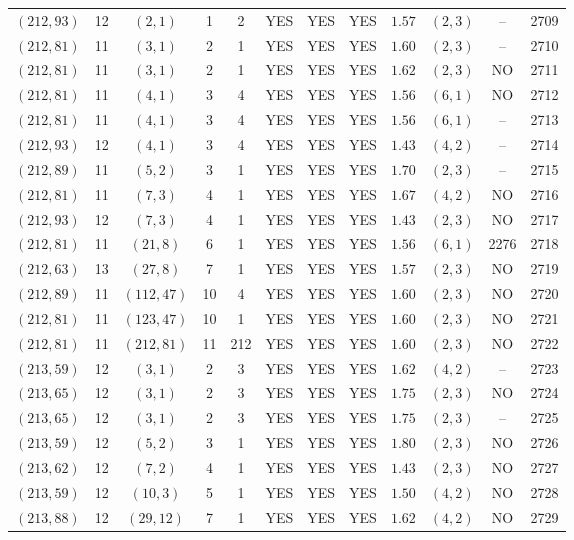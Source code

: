 \begin{longtable}{|c|c|c|c|c|c|c|c|c|c|c|c|}
$(212,93)$ & 12 & $(2,1)$ & 1 & 2 & YES & YES & YES & $1.57$ & $(2,3)$ & -- & 2709\\
$(212,81)$ & 11 & $(3,1)$ & 2 & 1 & YES & YES & YES & $1.60$ & $(2,3)$ & -- & 2710\\
$(212,81)$ & 11 & $(3,1)$ & 2 & 1 & YES & YES & YES & $1.62$ & $(2,3)$ & NO & 2711\\
$(212,81)$ & 11 & $(4,1)$ & 3 & 4 & YES & YES & YES & $1.56$ & $(6,1)$ & NO & 2712\\
$(212,81)$ & 11 & $(4,1)$ & 3 & 4 & YES & YES & YES & $1.56$ & $(6,1)$ & -- & 2713\\
$(212,93)$ & 12 & $(4,1)$ & 3 & 4 & YES & YES & YES & $1.43$ & $(4,2)$ & -- & 2714\\
$(212,89)$ & 11 & $(5,2)$ & 3 & 1 & YES & YES & YES & $1.70$ & $(2,3)$ & -- & 2715\\
$(212,81)$ & 11 & $(7,3)$ & 4 & 1 & YES & YES & YES & $1.67$ & $(4,2)$ & NO & 2716\\
$(212,93)$ & 12 & $(7,3)$ & 4 & 1 & YES & YES & YES & $1.43$ & $(2,3)$ & NO & 2717\\
$(212,81)$ & 11 & $(21,8)$ & 6 & 1 & YES & YES & YES & $1.56$ & $(6,1)$ & 2276 & 2718\\
$(212,63)$ & 13 & $(27,8)$ & 7 & 1 & YES & YES & YES & $1.57$ & $(2,3)$ & NO & 2719\\
$(212,89)$ & 11 & $(112,47)$ & 10 & 4 & YES & YES & YES & $1.60$ & $(2,3)$ & NO & 2720\\
$(212,81)$ & 11 & $(123,47)$ & 10 & 1 & YES & YES & YES & $1.60$ & $(2,3)$ & NO & 2721\\
$(212,81)$ & 11 & $(212,81)$ & 11 & 212 & YES & YES & YES & $1.60$ & $(2,3)$ & NO & 2722\\
$(213,59)$ & 12 & $(3,1)$ & 2 & 3 & YES & YES & YES & $1.62$ & $(4,2)$ & -- & 2723\\
$(213,65)$ & 12 & $(3,1)$ & 2 & 3 & YES & YES & YES & $1.75$ & $(2,3)$ & NO & 2724\\
$(213,65)$ & 12 & $(3,1)$ & 2 & 3 & YES & YES & YES & $1.75$ & $(2,3)$ & -- & 2725\\
$(213,59)$ & 12 & $(5,2)$ & 3 & 1 & YES & YES & YES & $1.80$ & $(2,3)$ & NO & 2726\\
$(213,62)$ & 12 & $(7,2)$ & 4 & 1 & YES & YES & YES & $1.43$ & $(2,3)$ & NO & 2727\\
$(213,59)$ & 12 & $(10,3)$ & 5 & 1 & YES & YES & YES & $1.50$ & $(4,2)$ & NO & 2728\\
$(213,88)$ & 12 & $(29,12)$ & 7 & 1 & YES & YES & YES & $1.62$ & $(4,2)$ & NO & 2729\\

\end{longtable}
